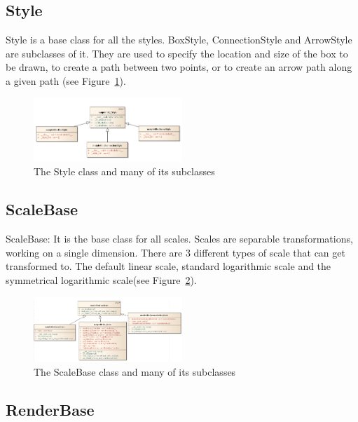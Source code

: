 \documentclass[pdftex,10pt,a4paper]{report}
\begin{document}

\subsection{Style}

Style is a base class for all the styles. BoxStyle,  ConnectionStyle and ArrowStyle are subclasses of it. They are used to specify the location and size of the box to be drawn,  to create a path between two points, or to create an arrow path along a given path (see Figure~\ref{fig:style}).

\begin{figure}[ht!]
        \centering
                \includegraphics[width=0.5\textwidth]{img/umls/candy/style}
        \caption{The Style class and many of its subclasses}\label{fig:style}
\end{figure}

\subsection{ScaleBase}

ScaleBase: It is the base class for all scales. Scales are separable transformations, working on a single dimension. There are 3 different types of scale that can get transformed to. The default linear scale,  standard logarithmic scale and the symmetrical logarithmic scale(see Figure~\ref{fig:scale}).

\begin{figure}[ht!]
        \centering
                \includegraphics[width=0.5\textwidth]{img/umls/candy/Scale}
        \caption{The ScaleBase class and many of its subclasses}\label{fig:scale}
\end{figure}

\subsection{RenderBase}
\end{document}
